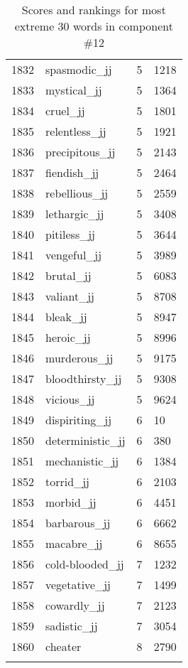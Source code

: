 \begin{longtable}[!htbp]{| rlr@{.}l |}
    1832 & spasmodic\_jj & 5 & 1218 \\
    1833 & mystical\_jj & 5 & 1364 \\
    1834 & cruel\_jj & 5 & 1801 \\
    1835 & relentless\_jj & 5 & 1921 \\
    1836 & precipitous\_jj & 5 & 2143 \\
    1837 & fiendish\_jj & 5 & 2464 \\
    1838 & rebellious\_jj & 5 & 2559 \\
    1839 & lethargic\_jj & 5 & 3408 \\
    1840 & pitiless\_jj & 5 & 3644 \\
    1841 & vengeful\_jj & 5 & 3989 \\
    1842 & brutal\_jj & 5 & 6083 \\
    1843 & valiant\_jj & 5 & 8708 \\
    1844 & bleak\_jj & 5 & 8947 \\
    1845 & heroic\_jj & 5 & 8996 \\
    1846 & murderous\_jj & 5 & 9175 \\
    1847 & bloodthirsty\_jj & 5 & 9308 \\
    1848 & vicious\_jj & 5 & 9624 \\
    1849 & dispiriting\_jj & 6 & 10 \\
    1850 & deterministic\_jj & 6 & 380 \\
    1851 & mechanistic\_jj & 6 & 1384 \\
    1852 & torrid\_jj & 6 & 2103 \\
    1853 & morbid\_jj & 6 & 4451 \\
    1854 & barbarous\_jj & 6 & 6662 \\
    1855 & macabre\_jj & 6 & 8655 \\
    1856 & cold-blooded\_jj & 7 & 1232 \\
    1857 & vegetative\_jj & 7 & 1499 \\
    1858 & cowardly\_jj & 7 & 2123 \\
    1859 & sadistic\_jj & 7 & 3054 \\
    1860 & cheater & 8 & 2790 \\
    \hline
    \caption{Scores and rankings for most extreme 30 words in component \#12} \\
\end{longtable}
